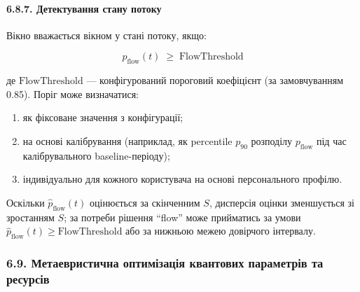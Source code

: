 \documentclass[12pt,a4paper]{article}
\begin{document}
\paragraph{6.8.7. Детектування стану потоку}\label{ux434ux435ux442ux435ux43aux442ux443ux432ux430ux43dux43dux44f-ux441ux442ux430ux43dux443-ux43fux43eux442ux43eux43aux443}



Вікно вважається вікном у стані потоку, якщо:



\[p_{\text{flow}}(t) \;\geq\; \text{FlowThreshold}\]



де \(\text{FlowThreshold}\) --- конфігурований пороговий коефіцієнт (за замовчуванням 0.85). Поріг може визначатися:



\begin{enumerate}

\def\labelenumi{\arabic{enumi}.}

\tightlist

\item

  як фіксоване значення з конфігурації;

\item

  на основі калібрування (наприклад, як percentile \(p_{90}\) розподілу \(p_{\text{flow}}\) під час калібрувального baseline-періоду);

\item

  індивідуально для кожного користувача на основі персонального профілю.

\end{enumerate}



Оскільки \(\hat{p}_{\text{flow}}(t)\) оцінюється за скінченним \(S\), дисперсія оцінки зменшується зі зростанням \(S\); за потреби рішення ``flow'' може прийматись за умови \(\hat{p}_{\text{flow}}(t) \geq \text{FlowThreshold}\) або за нижньою межею довірчого інтервалу.



\subsubsection{6.9. Метаевристична оптимізація квантових параметрів та ресурсів}\label{ux43cux435ux442ux430ux435ux432ux440ux438ux441ux442ux438ux447ux43dux430-ux43eux43fux442ux438ux43cux456ux437ux430ux446ux456ux44f-ux43aux432ux430ux43dux442ux43eux432ux438ux445-ux43fux430ux440ux430ux43cux435ux442ux440ux456ux432-ux442ux430-ux440ux435ux441ux443ux440ux441ux456ux432}
\end{document}
